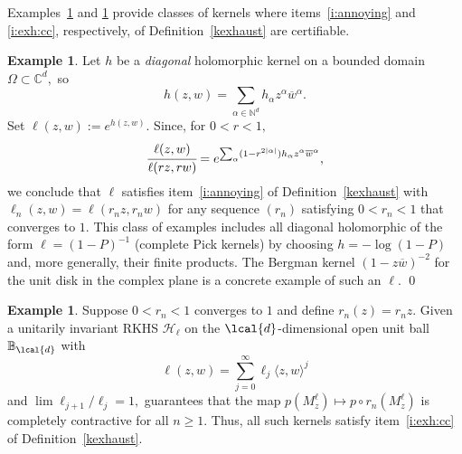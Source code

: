 \documentclass[a4paper,reqno,index]{amsart}
\newcommand{\df}[1]{{\textit{#1}}{\index{#1}}}
\numberwithin{equation}{section}
\newcommand{\ol}[1]{\overline{#1}}
\theoremstyle{definition}
\newtheorem{example}[theorem]{Example}
\begin{document}
 Examples~\ref{eg:certifiably-annoying} and \ref{eg:certify:cc} provide  classes of kernels where items~\ref{i:annoying}
 and \ref{i:exh:cc}, respectively, of Definition~\ref{kexhaust} are certifiable.

\begin{example}
\label{eg:certifiably-annoying}
Let $h$ be a \df{diagonal} holomorphic kernel on a bounded domain $\Omega\subset\mathbb{C}^d,$ so 
\[
h(z,w)=\sum_{\alpha\in\mathbb{N}^d}h_{\alpha}z^{\alpha}\overline{w}^{\alpha}.
\]
Set $\ell(z,w):=e^{h(z,w)}$. Since, for $0<r<1,$ 
\[
  \cfrac{\ell(z,w)}{\ell(rz, rw)}=e^{\sum_{\alpha}(1-r^{2|\alpha|})h_{\alpha}z^{\alpha}\overline{w}^{\alpha}},
\]
we conclude that $\ell$ satisfies item~\ref{i:annoying} of Definition~\ref{kexhaust} with $\ell_n(z,w)=\ell(r_n z,r_nw)$
for any sequence $(r_n)$ satisfying $0<r_n<1$ that converges to $1.$ This class of examples includes all diagonal holomorphic 
of the form $\ell=(1-P)^{-1}$ (complete Pick kernels) by choosing
$h=-\log(1-P)$ and, more generally, their finite products.  
The Bergman kernel $(1-z\ol{w})^{-2}$ for the unit disk in the complex plane is a concrete example of such an $\ell$.
\qed
\end{example}


\begin{example}
\label{eg:certify:cc}
   Suppose $0<r_n<1$ converges to $1$  and define $r_n(z)=r_n z$. Given a unitarily invariant RKHS $\mathcal{H}_{\ell}$ on the $\lcal{d}$-dimensional open unit ball $\mathbb{B}_{\lcal{d}}$ with 
   \[\ell(z,w)=\sum_{j=0}^{\infty}\ell_j\langle z,w \rangle^j \]
   and $\lim\ell_{j+1}/\ell_j=1,$
   \cite[Lemma 2.2]{HartzJEMS} guarantees that the map $p(M^{\ell}_z)\mapsto p\circ r_n(M^{\ell}_z)$ is completely contractive for all $n\ge 1$. Thus, all such kernels satisfy item~\ref{i:exh:cc} of Definition~\ref{kexhaust}.
\end{example}


 
 
\end{document}
